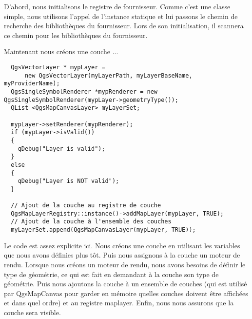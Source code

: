 D'abord, nous initialisons le registre de fournisseur. Comme c'est une classe 
simple, nous utilisons l'appel de l'instance statique et lui passons le chemin 
de recherche des bibliothèques du fournisseur. Lors de son initialisation, il 
scannera ce chemin pour les bibliothèques du fournisseur.

Maintenant nous créons une couche ...

\begin{verbatim}
  QgsVectorLayer * mypLayer =
      new QgsVectorLayer(myLayerPath, myLayerBaseName, myProviderName);
  QgsSingleSymbolRenderer *mypRenderer = new
QgsSingleSymbolRenderer(mypLayer->geometryType());
  QList <QgsMapCanvasLayer> myLayerSet;

  mypLayer->setRenderer(mypRenderer);
  if (mypLayer->isValid())
  {
    qDebug("Layer is valid");
  }
  else
  {
    qDebug("Layer is NOT valid");
  }

  // Ajout de la couche au registre de couche
  QgsMapLayerRegistry::instance()->addMapLayer(mypLayer, TRUE);
  // Ajout de la couche à l'ensemble des couches
  myLayerSet.append(QgsMapCanvasLayer(mypLayer, TRUE));

\end{verbatim}

Le code est assez explicite ici. Nous créons une couche en utilisant les variables
que nous avons définies plus tôt. Puis nous assignons à la couche un moteur de 
rendu. Lorsque nous créons un moteur de rendu, nous avons besoins de définir le 
type de géométrie, ce qui est fait en demandant à la couche son type de géométrie.
Puis nous ajoutons la couche à un ensemble de couches (qui est utilisé par 
QgsMapCanvas pour garder en mémoire quelles couches doivent être affichées et 
dans quel ordre) et au registre maplayer. Enfin, nous nous assurons que la couche
 sera visible.

